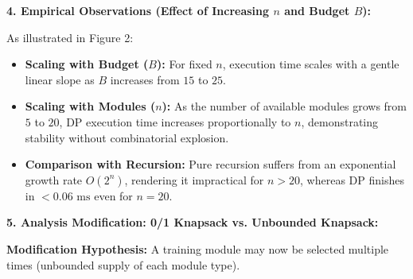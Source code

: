 \documentclass[12pt]{article}
\begin{document}
\textbf{4. Empirical Observations (Effect of Increasing $n$ and Budget $B$):}

As illustrated in Figure 2:
\begin{itemize}
    \item \textbf{Scaling with Budget ($B$):} For fixed $n$, execution time scales with a gentle linear slope as $B$ increases from $15$ to $25$.
    \item \textbf{Scaling with Modules ($n$):} As the number of available modules grows from $5$ to $20$, DP execution time increases proportionally to $n$, demonstrating stability without combinatorial explosion.
    \item \textbf{Comparison with Recursion:} Pure recursion suffers from an exponential growth rate $O(2^n)$, rendering it impractical for $n > 20$, whereas DP finishes in $< 0.06\text{ ms}$ even for $n=20$.
\end{itemize}

\textbf{5. Analysis Modification: 0/1 Knapsack vs. Unbounded Knapsack:}

\textbf{Modification Hypothesis:} A training module may now be selected multiple times (unbounded supply of each module type).
\end{document}

